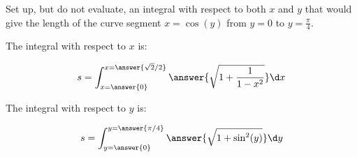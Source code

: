 \documentclass{ximera}
\author{Jim Talamo}
\begin{document}
\begin{exercise}

Set up, but do not evaluate, an integral with respect to both $x$ and $y$ that would give the length of the curve segment $x=\cos(y)$ from $y=0$ to $y=\frac{\pi}{4}$.

The integral with respect to $x$ is:

\[
s= \int_{x=\answer{0}}^{x=\answer{\sqrt{2}/2}} \answer{\sqrt{1+\frac{1}{1-x^2}}} \d x
\]

The integral with respect to $y$ is:

\[
s= \int_{y=\answer{0}}^{y=\answer{\pi/4}} \answer{\sqrt{1+\sin^2(y)}} \d y
\]

\end{exercise}
\end{document}
